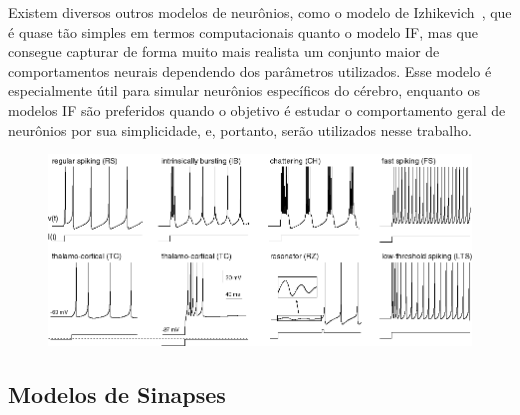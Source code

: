 Existem diversos outros modelos de neurônios, como o modelo de Izhikevich~\cite{izhikevichSimple2003}, que é quase tão simples em
termos computacionais quanto o modelo IF, mas que consegue capturar de forma muito mais realista um conjunto maior de
comportamentos neurais dependendo dos parâmetros utilizados. Esse modelo é especialmente útil para simular neurônios específicos
do cérebro, enquanto os modelos IF são preferidos quando o objetivo é estudar o comportamento geral de neurônios por sua
simplicidade, e, portanto, serão utilizados nesse trabalho.

\begin{figure}[!ht]
\centering\label{fig_izhikevich}
\includegraphics[width=\linewidth]{figuras/izhikevich.png}
\end{figure}

\subsection{Modelos de Sinapses}\label{subsection_modelos_sinapses}




